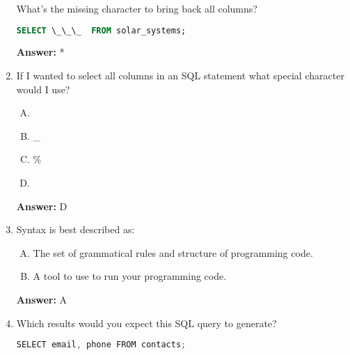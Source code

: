 \documentclass[12pt]{article}
\begin{document}
\begin{enumerate}[1.]
    \bigskip

    What's the missing character to bring back all columns?

    \bigskip

    \begin{lstlisting}[language=SQL]
    SELECT \_\_\_  FROM solar_systems;
    \end{lstlisting}

    \bigskip

    \textbf{Answer:} *

    \item

    If I wanted to select all columns in an SQL statement what special character
    would I use?

    \bigskip

    \begin{enumerate}[A.]
        \item ~
        \item \_
        \item \%
        \item \*
    \end{enumerate}

    \bigskip

    \textbf{Answer:} D

    \item

    Syntax is best described as:

    \bigskip

    \begin{enumerate}[A.]
        \item The set of grammatical rules and structure of programming code.
        \item A tool to use to run your programming code.
    \end{enumerate}

    \bigskip

    \textbf{Answer:} A

    \item

    Which results would you expect this SQL query to generate?

    \bigskip

    \begin{lstlisting}[language=Java]
    SELECT email, phone FROM contacts;
    \end{lstlisting}

    \bigskip

    \begin{enumerate}[A.]


\end{enumerate}
\end{enumerate}
\end{document}
